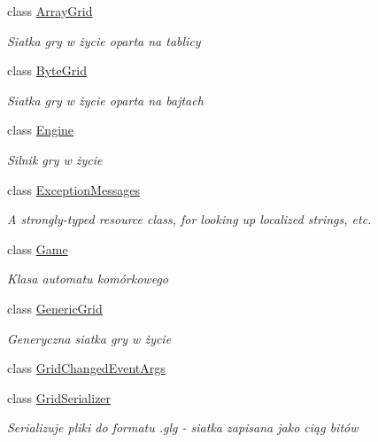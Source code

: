 \begin{DoxyCompactItemize}
\item 
class \hyperlink{class_convay_1_1_core_1_1_array_grid}{Array\+Grid}
\begin{DoxyCompactList}\small\item\em Siatka gry w życie oparta na tablicy \end{DoxyCompactList}\item 
class \hyperlink{class_convay_1_1_core_1_1_byte_grid}{Byte\+Grid}
\begin{DoxyCompactList}\small\item\em Siatka gry w życie oparta na bajtach \end{DoxyCompactList}\item 
class \hyperlink{class_convay_1_1_core_1_1_engine}{Engine}
\begin{DoxyCompactList}\small\item\em Silnik gry w życie \end{DoxyCompactList}\item 
class \hyperlink{class_convay_1_1_core_1_1_exception_messages}{Exception\+Messages}
\begin{DoxyCompactList}\small\item\em A strongly-\/typed resource class, for looking up localized strings, etc. \end{DoxyCompactList}\item 
class \hyperlink{class_convay_1_1_core_1_1_game}{Game}
\begin{DoxyCompactList}\small\item\em Klasa automatu komórkowego \end{DoxyCompactList}\item 
class \hyperlink{class_convay_1_1_core_1_1_generic_grid}{Generic\+Grid}
\begin{DoxyCompactList}\small\item\em Generyczna siatka gry w życie \end{DoxyCompactList}\item 
class \hyperlink{class_convay_1_1_core_1_1_grid_changed_event_args}{Grid\+Changed\+Event\+Args}
\item 
class \hyperlink{class_convay_1_1_core_1_1_grid_serializer}{Grid\+Serializer}
\begin{DoxyCompactList}\small\item\em Serializuje pliki do formatu .glg -\/ siatka zapisana jako ciąg bitów \end{DoxyCompactList}\item 

\end{DoxyCompactItemize}
